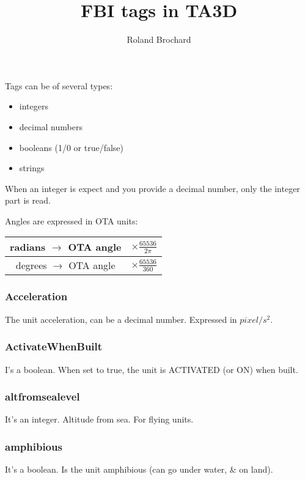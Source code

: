 \documentclass[a4paper,10pt]{article}
\title{FBI tags in TA3D}
\author{Roland Brochard}
\date{}
\begin{document}
\maketitle


\pagebreak

Tags can be of several types:
\begin{itemize}
 \item integers
 \item decimal numbers
 \item booleans (1/0 or true/false)
 \item strings
\end{itemize}
When an integer is expect and you provide a decimal number, only the integer part is read.

Angles are expressed in OTA units:\\
\begin{tabular}{|c|c|}
 \hline
 radians $\rightarrow$ OTA angle & $\times \frac{65536}{2 \pi}$ \\
 \hline
 degrees $\rightarrow$ OTA angle & $\times \frac{65536}{360}$ \\
 \hline
\end{tabular}


\subsubsection{Acceleration}
The unit acceleration, can be a decimal number. Expressed in $pixel/s^2$.

\subsubsection{ActivateWhenBuilt}
I's a boolean. When set to true, the unit is ACTIVATED (or ON) when built.

\subsubsection{altfromsealevel}
It's an integer. Altitude from sea. For flying units.

\subsubsection{amphibious}
It's a boolean.
Is the unit amphibious (can go under water, \& on land).
\end{document}

